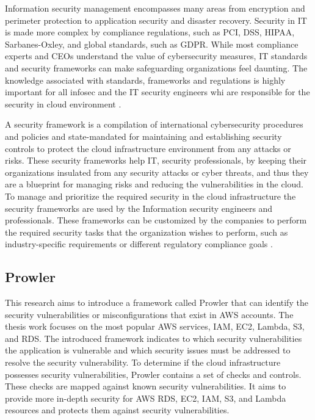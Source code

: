 \par Information security management encompasses many areas from encryption and perimeter protection to application security and disaster recovery.
Security in IT is made more complex by compliance regulations, such as PCI, DSS, HIPAA, Sarbanes-Oxley, and global standards, such as GDPR.
While most compliance experts and CEOs understand the value of cybersecurity measures, IT standards and security frameworks can make safeguarding organizations feel daunting.
The knowledge associated with standards, frameworks and
regulations is highly important for all infosec and the IT
security engineers whi are responsible for the security
in cloud environment \cite{48}.

\par A security framework is a compilation of
international cybersecurity procedures and policies and
state-mandated for maintaining and establishing security
controls to protect the cloud infrastructure environment
from
any
attacks or risks.
These security frameworks help IT, security
professionals, by keeping their organizations insulated from any security attacks or cyber threats, and thus they are a blueprint for managing risks and reducing the vulnerabilities in the cloud.
To manage and prioritize the required security in the cloud
infrastructure the
security
frameworks are used by the Information security engineers
and professionals.
These frameworks can be customized by the companies to
perform the required security tasks that the
organization wishes to perform, such as
industry-specific requirements or different regulatory compliance goals \cite{48}.

\subsection{Prowler}

\par This research aims to introduce a framework called Prowler that can identify the security vulnerabilities or misconfigurations that exist in AWS accounts.
The thesis work focuses on the most popular AWS services,
IAM,
EC2, Lambda, S3, and RDS.
The introduced framework indicates to which security vulnerabilities the application is vulnerable and which security issues must be addressed to resolve the security vulnerability.
To determine if the cloud infrastructure possesses security vulnerabilities, Prowler contains a set of checks and controls.
These checks are mapped against known security vulnerabilities.
It aims to provide more in-depth security for AWS RDS,
EC2, IAM, S3, and Lambda resources and protects them
against security vulnerabilities.\\

